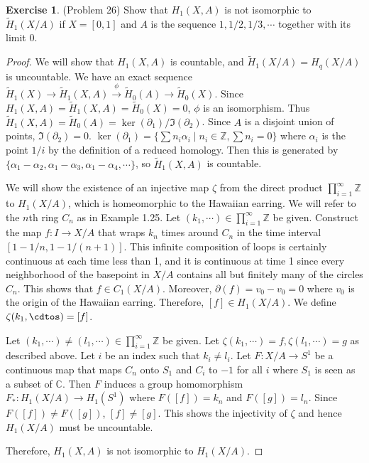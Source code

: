 \documentclass[12pt, psamsfonts]{amsart}
\theoremstyle{definition}
\newtheorem*{exer}{Exercise}
\theoremstyle{remark}
\numberwithin{equation}{section}
\begin{document}
\begin{exer}{(Problem 26)}
  Show that $H_1(X, A)$ is not isomorphic to $\tilde{H}_1(X / A)$ if $X = [0, 1]$ and $A$ is the sequence $1, 1/2, 1/3, \cdots$ together with its limit 0.
\end{exer}

\begin{proof}
  We will show that $H_1(X, A)$ is countable, and $\tilde{H}_1(X / A) = H_q(X / A)$ is uncountable.
  We have an exact sequence $\tilde{H}_1(X) \rightarrow \tilde{H}_1(X, A) \xrightarrow{\phi} \tilde{H}_0(A) \rightarrow \tilde{H}_0(X)$.
  Since $H_1(X, A) = \tilde{H}_1(X, A) = \tilde{H}_0(X) = 0$, $\phi$ is an isomorphism.
  Thus $\tilde{H}_1(X, A) = \tilde{H}_0(A) = \ker(\partial_1)/\Im(\partial_2)$.
  Since $A$ is a disjoint union of points, $\Im(\partial_2) = 0$.
  $\ker(\partial_1) = \{ \sum n_i\alpha_i \mid n_i \in \mathbb{Z}, \sum n_i = 0 \}$ where $\alpha_i$ is the point $1/i$ by the definition of a reduced homology.
  Then this is generated by $\{ \alpha_1 - \alpha_2, \alpha_1 - \alpha_3, \alpha_1 - \alpha_4, \cdots \}$, so $\tilde{H}_1(X, A)$ is countable.

  We will show the existence of an injective map $\zeta$ from the direct product $\prod_{i=1}^{\infty} \mathbb{Z}$ to $H_1(X / A)$, which is homeomorphic to the Hawaiian earring.
  We will refer to the $n$th ring $C_n$ as in Example 1.25.
  Let $(k_1, \cdots) \in \prod_{i=1}^{\infty} \mathbb{Z}$ be given.
  Construct the map $f: I \rightarrow X / A$ that wraps $k_n$ times around $C_n$ in the time interval $[1 - 1/n, 1 - 1/(n + 1)]$.
  This infinite composition of loops is certainly continuous at each time less than 1, and it is continuous at time 1 since every neighborhood of the basepoint in $X / A$ contains all but finitely many of the circles $C_n$.
  This shows that $f \in C_1(X / A)$.
  Moreover, $\partial(f) = v_0 - v_0 = 0$ where $v_0$ is the origin of the Hawaiian earring.
  Therefore, $[f] \in H_1(X / A)$.
  We define $\zeta(k_1, \cdtos) = [f]$.

  Let $(k_1, \cdots) \ne (l_1, \cdots) \in \prod_{i=1}^{\infty} \mathbb{Z}$ be given.
  Let $\zeta(k_1, \cdots) = f, \zeta(l_1, \cdots) = g$ as described above.
  Let $i$ be an index such that $k_i \ne l_i$.
  Let $F: X / A \rightarrow S^1$ be a continuous map that maps $C_n$ onto $S_1$ and $C_i$ to $-1$ for all $i$ where $S_1$ is seen as a subset of $\mathbb{C}$.
  Then $F$ induces a group homomorphism $F_* : H_1(X / A) \rightarrow H_1(S^1)$ where $F([f]) = k_n$ and $F([g]) = l_n$.
  Since $F([f]) \ne F([g])$, $[f] \ne [g]$.
  This shows the injectivity of $\zeta$ and hence $H_1(X / A)$ must be uncountable.

  Therefore, $H_1(X, A)$ is not isomorphic to $H_1(X / A)$.
\end{proof}
\end{document}
